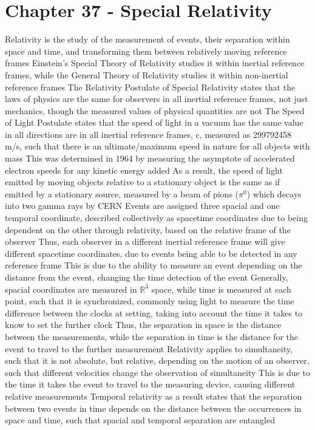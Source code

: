 \documentclass[11 pt, twoside]{article}
\newenvironment{outline*}
{
	\begin{outline}[enumerate]
	}
	{\end{outline}
}
\begin{document}
\section{Chapter 37 - Special Relativity}
\begin{outline*}
\1 Relativity is the study of the measurement of events, their separation within space and time, and transforming them between relatively moving reference frames
\2 Einstein's Special Theory of Relativity studies it within inertial reference frames, while the General Theory of Relativity studies it within non-inertial reference frames
\1 The Relativity Postulate of Special Relativity states that the laws of physics are the same for observers in all inertial reference frames, not just mechanics, though the measured values of physical quantities are not
\2 The Speed of Light Postulate states that the speed of light in a vacuum has the same value in all directions are in all inertial reference frames, c, measured as 299792458 m/s, such that there is an ultimate/maximum speed in nature for all objects with mass
\3 This was determined in 1964 by measuring the asymptote of accelerated electron speeds for any kinetic energy added
\3 As a result, the speed of light emitted by moving objects relative to a stationary object is the same as if emitted by a stationary source, measured by a beam of pions ($\pi^0$) which decays into two gamma rays by CERN
\1 Events are assigned three spacial and one temporal coordinate, described collectively as spacetime coordinates due to being dependent on the other through relativity, based on the relative frame of the observer
\2 Thus, each observer in a different inertial reference frame will give different spacetime coordinates, due to events being able to be detected in any reference frame
\2 This is due to the ability to measure an event depending on the distance from the event, changing the time detection of the event
\2 Generally, spacial coordinates are measured in $\mathbb{R}^3$ space, while time is measured at each point, such that it is synchronized, commonly using light to measure the time difference between the clocks at setting, taking into account the time it takes to know to set the further clock
\3 Thus, the separation in space is the distance between the measurements, while the separation in time is the distance for the event to travel to the further measurement
\1 Relativity applies to simultaneity, such that it is not absolute, but relative, depending on the motion of an observer, such that different velocities change the observation of simultaneity
\2 This is due to the time it takes the event to travel to the measuring device, causing different relative measurements
\1 Temporal relativity as a result states that the separation between two events in time depends on the distance between the occurrences in space and time, such that spacial and temporal separation are entangled
\end{outline*}
\end{document}
